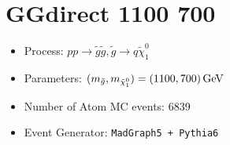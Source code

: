\documentclass[12pt]{article}
\begin{document}
\section{GGdirect 1100 700 }

\begin{itemize}
\item  Process:  $pp \to \tilde g \tilde g, \tilde g \to q \tilde \chi_1^0$

\item  Parameters:  $(m_{\tilde g}, m_{\tilde \chi_1^0}) = (1100, 700) \,{\rm GeV}$

\item  Number of Atom MC events:  6839

\item  Event Generator: { \tt  MadGraph5 + Pythia6
 }
\end{itemize}
\end{document}
